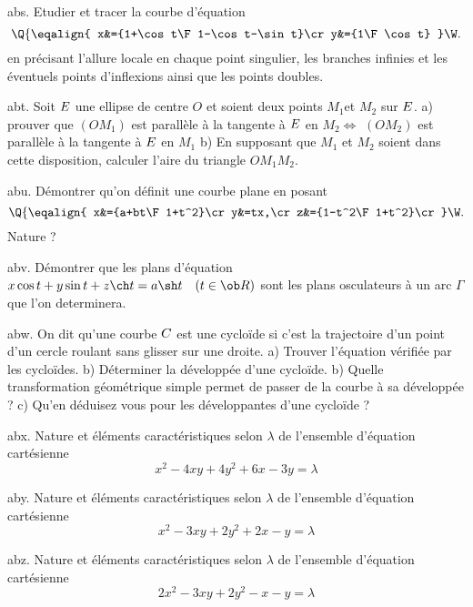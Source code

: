\exo [Level=1,Fight=0,Learn=1,Field=\CourbesParamétréesCartésiennes,Type=\Exercices,Origin=] abs. 
Etudier et tracer la courbe d'équation 
$$
\Q\{\eqalign{
x&={1+\cos t\F 1-\cos t-\sin t}\cr
y&={1\F\cos t}
}\W.
$$ 
en précisant l'allure  locale en chaque point singulier, les branches infinies 
et les éventuels points d'inflexions ainsi que les points doubles. 

\exo [Level=2,Fight=1,Learn=1,Field=\RepèreDeFrenet,Type=\Exercices,Origin=] abt. 
Soit $\sc E$ une ellipse de centre $O$ et soient deux points $M_1 $et $M_2$ sur $\sc E$. 
\pn
a) prouver que $(OM_1)$ est parallèle à la tangente à $\sc E$ en $M_2\Longleftrightarrow$ 
$(OM_2)$ est parallèle à la tangente à $\sc E$ en $M_1$\pn
b) En supposant que $M_1$ et $M_2$ soient dans cette disposition, 
calculer l'aire du triangle $OM_1M_2$. 

\exo [Level=2,Fight=1,Learn=1,Field=\RepèreDeFrenet,Type=\Exercices,Origin=] abu. 
Démontrer qu'on définit une courbe plane en posant 
$$
\Q\{\eqalign{
x&={a+bt\F1+t^2}\cr 
y&=tx,\cr 
z&={1-t^2\F1+t^2}\cr
}\W.
$$
Nature ? 

\exo [Level=2,Fight=3,Learn=2,Field=\RepèreDeFrenet|\Enveloppes,Type=\Exercices,Origin=\MP] abv. 
Démontrer que les plans d'équation $x\cos t+y\sin t+z\ch t=a\sh t\quad(t\in\ob R)$ 
sont les plans osculateurs à un arc $\Gamma$ que l'on determinera. 

\exo [Level=2,Fight=3,Learn=2,Field=\Roulement|\Développées,Type=\Exercices,Origin=\MP] abw. 
On dit qu'une courbe $\sc C$ est une cycloïde si 
c'est la trajectoire d'un point d'un cercle roulant sans glisser sur une droite. 
\pn
a) Trouver l'équation vérifiée par les cycloïdes. 
b) Déterminer la développée d'une cycloïde. \pn
b) Quelle transformation géométrique simple permet de passer de la courbe à sa développée ?\pn
c) Qu'en déduisez vous pour les développantes d'une cycloïde ? 

\exo [Level=2,Fight=1,Learn=1,Field=\FormesQuadratiques,Type=\Exercices,Origin=] abx. 
Nature et éléments caractéristiques selon $\lambda$ 
de l'ensemble d'équation cartésienne 
$$ 
x^2-4xy+4y^2+6x-3y=\lambda
$$

\exo [Level=2,Fight=1,Learn=1,Field=\FormesQuadratiques,Type=\Exercices,Origin=] aby. 
Nature et éléments caractéristiques selon $\lambda$ 
de l'ensemble d'équation cartésienne 
$$ 
x^2-3xy+2y^2+2x-y=\lambda
$$

\exo [Level=2,Fight=1,Learn=1,Field=\FormesQuadratiques,Type=\Exercices,Origin=] abz. 
Nature et éléments caractéristiques selon $\lambda$ 
de l'ensemble d'équation cartésienne 
$$ 
2x^2-3xy+2y^2-x-y=\lambda
$$

